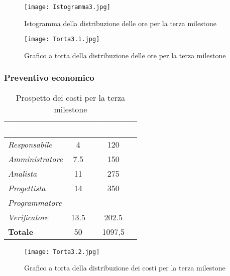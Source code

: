 \begin{figure}[H]
    \texttt{[image: Istogramma3.jpg]}
    \caption{Istogramma della distribuzione delle ore per la terza milestone}
\end{figure}

\begin{figure}[H]
    \texttt{[image: Torta3.1.jpg]}
    \caption{Grafico a torta della distribuzione delle ore per la terza milestone}
\end{figure}

\newpage
\subsubsection{Preventivo economico}

\begin{table}[H]
    \renewcommand\arraystretch{1.5}
    \centering
    \begin{tabular}{|l|c|c|}
    \hline
    \rowcolor[HTML]{036400}
    \textcolor{white}{\textbf{Ruolo}} & \multicolumn{1}{l|}{\textcolor{white}{\textbf{Ore}}} & \multicolumn{1}{l|}{\textcolor{white}{\textbf{Costo (€)}}} \\ \hline
    \rowcolor[HTML]{EFEFEF}\textit{Responsabile}   & 4    & 120   \\ \hline
    \rowcolor[HTML]{C0C0C0}\textit{Amministratore} & 7.5  & 150   \\ \hline
    \rowcolor[HTML]{EFEFEF}\textit{Analista}       & 11   & 275   \\ \hline
    \rowcolor[HTML]{C0C0C0}\textit{Progettista}    & 14   & 350   \\ \hline
    \rowcolor[HTML]{EFEFEF}\textit{Programmatore}  & -    & -     \\ \hline
    \rowcolor[HTML]{C0C0C0}\textit{Verificatore}   & 13.5 & 202.5 \\ \hline
    \rowcolor[HTML]{EFEFEF}\textbf{Totale}         & 50   & 1097,5\\ \hline
    \end{tabular}
    \caption{Prospetto dei costi per la terza milestone}
\end{table}

\begin{figure}[H]
    \texttt{[image: Torta3.2.jpg]}
    \caption{Grafico a torta della distribuzione dei costi per la terza milestone}
\end{figure}



